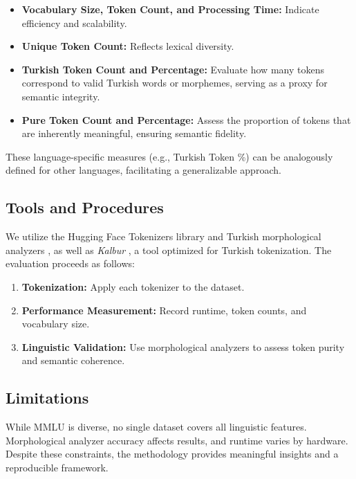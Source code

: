   \begin{itemize}
      \item \textbf{Vocabulary Size, Token Count, and Processing Time:} Indicate efficiency and scalability.
      \item \textbf{Unique Token Count:} Reflects lexical diversity.
      \item \textbf{Turkish Token Count and Percentage:} Evaluate how many tokens correspond to valid Turkish words or morphemes, serving as a proxy for semantic integrity.
      \item \textbf{Pure Token Count and Percentage:} Assess the proportion of tokens that are inherently meaningful, ensuring semantic fidelity.
  \end{itemize}
  
  These language-specific measures (e.g., Turkish Token \%) can be analogously defined for other languages, facilitating a generalizable approach.
  
  \subsection{Tools and Procedures}
  
  We utilize the Hugging Face Tokenizers library and Turkish morphological analyzers \cite{eryigit_itu_2014}, as well as \textit{Kalbur} \cite{aksoy_ahmetaxkalbur_2024}, a tool optimized for Turkish tokenization. The evaluation proceeds as follows:
  
  \begin{enumerate}
      \item \textbf{Tokenization:} Apply each tokenizer to the dataset.
      \item \textbf{Performance Measurement:} Record runtime, token counts, and vocabulary size.
      \item \textbf{Linguistic Validation:} Use morphological analyzers to assess token purity and semantic coherence.
  \end{enumerate}
  
  \subsection{Limitations}
  
  While MMLU is diverse, no single dataset covers all linguistic features. Morphological analyzer accuracy affects results, and runtime varies by hardware. Despite these constraints, the methodology provides meaningful insights and a reproducible framework.
  
